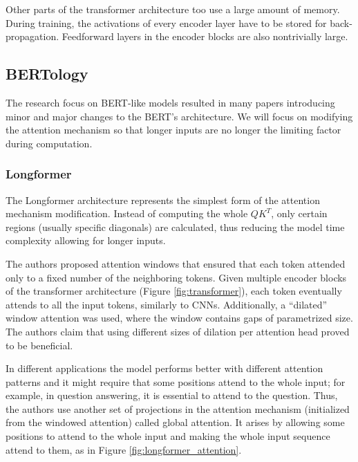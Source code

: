 Other parts of the transformer architecture too use a large amount of memory. During training, the activations of every encoder layer have to be stored for back-propagation. Feedforward layers in the encoder blocks are also nontrivially large.

\subsection{BERTology}

The research focus on BERT-like models resulted in many papers introducing minor and major changes to the BERT's architecture.
We will focus on modifying the attention mechanism so that longer inputs are no longer the limiting factor during computation.

\subsubsection{Longformer}

The Longformer architecture \citep{longformer} represents the simplest form of the attention mechanism modification.
Instead of computing the whole $QK^T$, only certain regions (usually specific diagonals) are calculated, thus reducing the model time complexity allowing for longer inputs.

The authors proposed attention windows that ensured that each token attended only to a fixed number of the neighboring tokens. 
Given multiple encoder blocks of the transformer architecture (Figure \ref{fig:transformer}), each token eventually attends to all the input tokens, similarly to CNNs.  
Additionally, a ``dilated'' window attention was used, where the window contains gaps of parametrized size. 
The authors claim that using different sizes of dilation per attention head proved to be beneficial.

In different applications the model performs better with different attention patterns and it might require that some positions attend to the whole input; for example, in question answering, it is essential to attend to the question.
Thus, the authors use another set of projections in the attention mechanism (initialized from the windowed attention) called global attention.
It arises by allowing some positions to attend to the whole input and making the whole input sequence attend to them, as in Figure \ref{fig:longformer_attention}.  %

